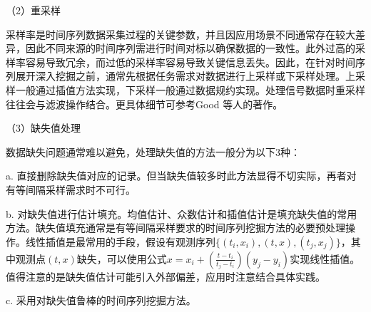 （2）重采样

采样率是时间序列数据采集过程的关键参数，并且因应用场景不同通常存在较大差异，因此不同来源的时间序列需进行时间对标以确保数据的一致性。此外过高的采样率容易导致冗余，而过低的采样率容易导致关键信息丢失。因此，在针对时间序列展开深入挖掘之前，通常先根据任务需求对数据进行上采样或下采样处理。上采样一般通过插值方法实现，下采样一般通过数据规约实现。处理信号数据时重采样往往会与滤波操作结合。更具体细节可参考Good 等人的著作\cite{good2006resampling}。

（3）缺失值处理

数据缺失问题通常难以避免，处理缺失值的方法一般分为以下3种：

a. 直接删除缺失值对应的记录。但当缺失值较多时此方法显得不切实际，再者对有等间隔采样需求时不可行。

b. 对缺失值进行估计填充。均值估计、众数估计和插值估计是填充缺失值的常用方法。缺失值填充通常是有等间隔采样要求的时间序列挖掘方法的必要预处理操作。线性插值是最常用的手段，假设有观测序列$\{(t_{i}, x_{i}), (t, x), (t_{j}, x_{j})\}$，其中观测点$(t, x)$缺失，可以使用公式$x = x_{i} + (\frac{t-t_{i}}{t_{j}-t_{i}})(y_{j} - y_{i})$实现线性插值。值得注意的是缺失值估计可能引入外部偏差，应用时注意结合具体实践。

c. 采用对缺失值鲁棒的时间序列挖掘方法。


